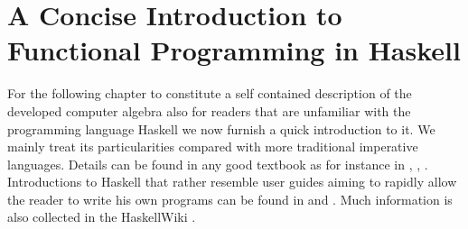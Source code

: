 \documentclass[a4paper,12pt, DIV=14, BCOR=5mm, twoside, headsepline]{scrbook}
\begin{document}
\section{A Concise Introduction to Functional Programming in Haskell}
For the following chapter to constitute a self contained description of the developed computer algebra also for readers that are unfamiliar with the programming language Haskell \cite{Marlow_haskell2010} we now furnish a quick introduction to it. We mainly treat its particularities compared with more traditional imperative languages.
Details can be found in any good textbook as for instance in \cite{Thompson99thecraft}, \cite{bird_2014}, \cite{hutton_2007}. Introductions to Haskell that rather resemble user guides aiming to rapidly allow the reader to write his own programs can be found in  \cite{OSullivan2008} and  \cite{Lipovaca:2011:LYH:2018642}. Much information is also collected in the HaskellWiki \cite{wiki:xxx}.
\end{document}
